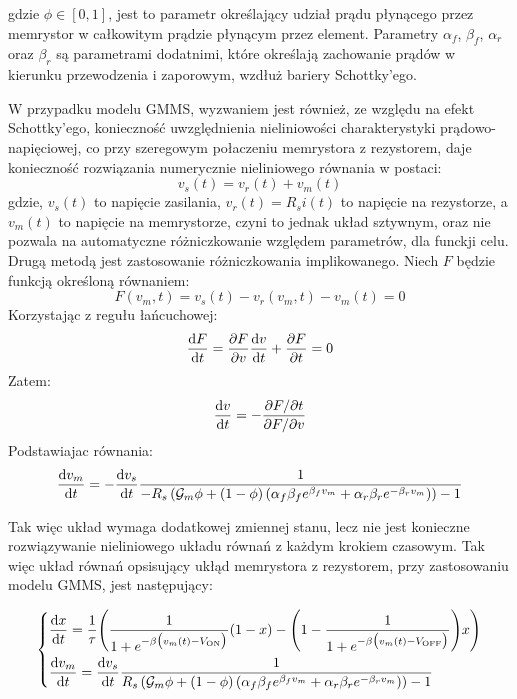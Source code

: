 \documentclass[11pt, oneside]{article}
\newcommand{\der}{{\rm d}}
\newcommand{\G}{\mathcal{G}}
\newcommand{\von}{V_{\rm ON}}
\newcommand{\voff}{V_{\rm OFF}}
\newcommand{\dert}[1]{\frac{{\rm d} {#1}}{{\rm d} t} }
\begin{document}
gdzie $\phi \in [0,1]$, jest to parametr określający udział prądu płynącego przez memrystor w całkowitym prądzie płynącym przez element. Parametry $\alpha_f$, $\beta_f$, $\alpha_r$ oraz $\beta_r$ są parametrami dodatnimi, które określają zachowanie prądów w kierunku przewodzenia i zaporowym, wzdłuż bariery Schottky'ego.

W przypadku modelu GMMS, wyzwaniem jest również, ze względu na efekt Schottky'ego, konieczność uwzględnienia nieliniowości charakterystyki prądowo-napięciowej, co przy szeregowym połaczeniu memrystora z rezystorem, daje konieczność rozwiązania numerycznie nieliniowego równania w postaci:
\begin{equation}
    v_s(t) = v_r(t) + v_m(t)
\end{equation}
gdzie, $v_s(t)$ to napięcie zasilania, $v_r(t) = R_s i(t)$ to napięcie na rezystorze, a $v_m(t)$ to napięcie na memrystorze, czyni to jednak układ sztywnym, oraz nie pozwala na automatyczne różniczkowanie względem parametrów, dla funckji celu. Drugą metodą jest zastosowanie różniczkowania implikowanego.
Niech $F$ będzie funkcją określoną równaniem:
\begin{equation}
    F(v_m, t) = v_s(t) - v_r(v_m, t) - v_m(t) = 0
\end{equation}
Korzystając z regułu łańcuchowej:
\begin{equation}
    \frac{\der F}{\der t} = \frac{\partial F}{\partial v} \frac{\der v}{\der t} + \frac{\partial F}{\partial t} = 0
\end{equation}
Zatem:
\begin{equation}
    \frac{\der v}{\der t} = -\frac{\partial F / \partial t}{\partial F / \partial v}
\end{equation}
Podstawiajac równania:
\begin{equation}
    \frac{\der v_m}{\der t} = - \frac{\der v_s}{\der t}\frac{1}{- R_s \left(\G_{m} \phi + \left(1 - \phi\right) \left(\alpha_f \beta_f e^{\beta_f v_m} + \alpha_r \beta_r e^{- \beta_r v_m}\right)\right) - 1}
\end{equation}

Tak więc układ wymaga dodatkowej zmiennej stanu, lecz nie jest konieczne rozwiązywanie nieliniowego układu równań z każdym krokiem czasowym. Tak więc układ równań opsisujący ukłąd memrystora z rezystorem, przy zastosowaniu modelu GMMS, jest następujący:

\begin{equation}
    \left\{
    \begin{aligned}
         & \dert{x} = \frac{1}{\tau} \Bigg( \frac{1}{1+e^{-\beta \big(v_m(t)-\von\big)}} (1-x)  -\Bigg(1- \frac{1}{1+e^{-\beta \big(v_m(t)-\voff\big)}} \Bigg) x \Bigg)                                            \\
         & \frac{\der v_m}{\der t} = \frac{\der v_s}{\der t}\frac{1}{ R_s \left(\G_{m} \phi + \left(1 - \phi\right) \left(\alpha_f \beta_f e^{\beta_f v_m} + \alpha_r \beta_r e^{- \beta_r v_m}\right)\right) - 1}
    \end{aligned}
    \right.
\end{equation}
\end{document}
